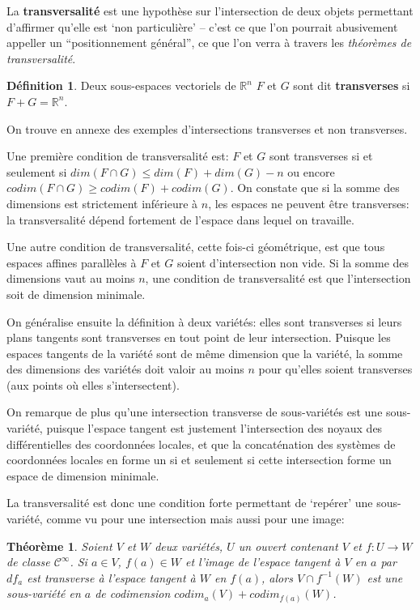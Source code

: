 \documentclass[a4paper]{article}
\newcommand{\cinf}{\mathcal{C}^\infty}
\newcommand{\R}{\mathbb{R}}
\newtheorem{thm}{Théorème}
\theoremstyle{definition}
\newtheorem{defn}{Définition}
\begin{document}
La \textbf{transversalité} est une hypothèse sur l'intersection de deux objets permettant d'affirmer qu'elle est `non particulière' -- c'est ce que l'on pourrait abusivement appeller un ``positionnement général'', ce que l'on verra à travers les \textit{théorèmes de transversalité}.
\begin{defn}
	Deux sous-espaces vectoriels de $\R^n$ $F$ et $G$ sont dit \textbf{transverses} si $F+G=\R^n$.
\end{defn}

On trouve en annexe des exemples d'intersections transverses et non transverses.

Une première condition de transversalité est: $F$ et $G$ sont transverses si et seulement si $dim(F\cap G)\leq dim(F)+dim(G)-n$ ou encore $codim(F\cap G)\geq codim(F)+codim(G)$.
On constate que si la somme des dimensions est strictement inférieure à $n$, les espaces ne peuvent être transverses: la transversalité dépend fortement de l'espace dans lequel on travaille.

Une autre condition de transversalité, cette fois-ci géométrique, est que tous espaces affines parallèles à $F$ et $G$ soient d'intersection non vide.
Si la somme des dimensions vaut au moins $n$, une condition de transversalité est que l'intersection soit de dimension minimale.

On généralise ensuite la définition à deux variétés: elles sont transverses si leurs plans tangents sont transverses en tout point de leur intersection.
Puisque les espaces tangents de la variété sont de même dimension que la variété, la somme des dimensions des variétés doit valoir au moins $n$ pour qu'elles soient transverses (aux points où elles s'intersectent).

On remarque de plus qu'une intersection transverse de sous-variétés est une sous-variété, puisque l'espace tangent est justement l'intersection des noyaux des différentielles des coordonnées locales, et que la concaténation des systèmes de coordonnées locales en forme un si et seulement si cette intersection forme un espace de dimension minimale.

La transversalité est donc une condition forte permettant de `repérer' une sous-variété, comme vu pour une intersection mais aussi pour une image:
\begin{thm}
	Soient $V$ et $W$ deux variétés, $U$ un ouvert contenant $V$ et $f:U\to W$ de classe $\cinf$.
	Si $a\in V$, $f(a)\in W$ et l'image de l'espace tangent à $V$ en $a$ par $df_a$ est transverse à l'espace tangent à $W$ en $f(a)$, alors $V\cap f^{-1}(W)$ est une sous-variété en $a$ de codimension $codim_a(V) + codim_{f(a)}(W)$.
\end{thm}
\end{document}
